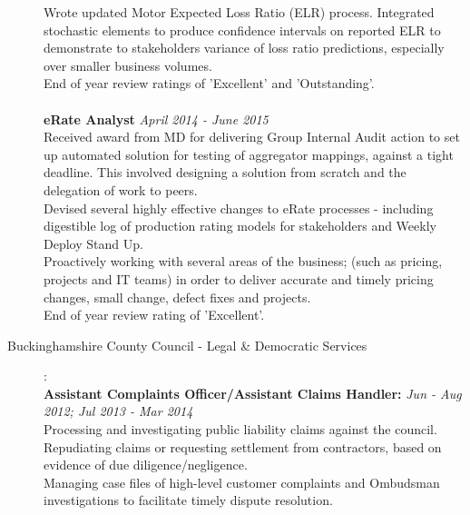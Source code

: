 \documentclass[11pt]{article}
\begin{document}
\begin{description}
\textbullet \quad Wrote updated Motor Expected Loss Ratio (ELR) process. Integrated stochastic elements to produce confidence intervals on reported ELR to demonstrate to stakeholders variance of loss ratio predictions, especially over smaller business volumes. \\
\textbullet \quad End of year review ratings of 'Excellent' and 'Outstanding'.
\\\\
\textbf{eRate Analyst} \emph{April 2014 - June 2015}\\
\textbullet \quad Received award from MD for delivering Group Internal Audit action to set up automated solution for testing of aggregator mappings, against a tight deadline. This involved designing a solution from scratch and the delegation of work to peers.\\
\textbullet \quad Devised several highly effective changes to eRate processes - including digestible log of production rating models for stakeholders and Weekly Deploy Stand Up.\\
\textbullet \quad Proactively working with several areas of the business; (such as pricing, projects and IT teams) in order to deliver accurate and timely pricing changes, small change, defect fixes and projects.\\
\textbullet \quad End of year review rating of 'Excellent'.


\item[Buckinghamshire County Council - Legal \& Democratic Services]:\\
\textbf{Assistant Complaints Officer/Assistant Claims Handler:} \emph{Jun - Aug 2012; Jul 2013 - Mar 2014}\\
\textbullet \quad Processing and investigating public liability claims against the council. Repudiating claims or requesting settlement from contractors, based on evidence of due diligence/negligence. \\
\textbullet \quad Managing case files of high-level customer complaints and Ombudsman investigations to facilitate timely dispute resolution.


\end{description}
\end{document}
